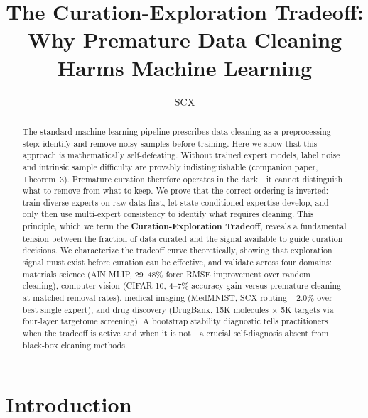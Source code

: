 %

\title{The Curation-Exploration Tradeoff: Why Premature Data Cleaning Harms Machine Learning}

\author{SCX}



\maketitle

\begin{abstract}
The standard machine learning pipeline prescribes data cleaning as a preprocessing step: identify and remove noisy samples before training. Here we show that this approach is mathematically self-defeating. Without trained expert models, label noise and intrinsic sample difficulty are provably indistinguishable (companion paper, Theorem~3). Premature curation therefore operates in the dark---it cannot distinguish what to remove from what to keep. We prove that the correct ordering is inverted: train diverse experts on raw data first, let state-conditioned expertise develop, and only then use multi-expert consistency to identify what requires cleaning. This principle, which we term the \textbf{Curation-Exploration Tradeoff}, reveals a fundamental tension between the fraction of data curated and the signal available to guide curation decisions. We characterize the tradeoff curve theoretically, showing that exploration signal must exist before curation can be effective, and validate across four domains: materials science (AlN MLIP, 29--48\% force RMSE improvement over random cleaning), computer vision (CIFAR-10, 4--7\% accuracy gain versus premature cleaning at matched removal rates), medical imaging (MedMNIST, SCX routing +2.0\% over best single expert), and drug discovery (DrugBank, 15K molecules $\times$ 5K targets via four-layer targetome screening). A bootstrap stability diagnostic tells practitioners when the tradeoff is active and when it is not---a crucial self-diagnosis absent from black-box cleaning methods.
\end{abstract}

\section{Introduction}

